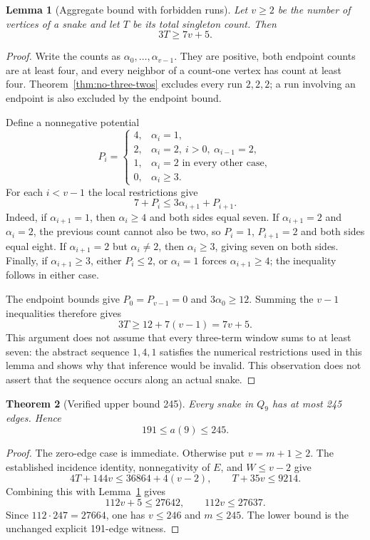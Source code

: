 \documentclass[11pt,a4paper]{article}
\newtheorem{theorem}{Theorem}[section]
\newtheorem{lemma}[theorem]{Lemma}
\theoremstyle{definition}
\theoremstyle{remark}
\newcommand{\Q}{Q}
\begin{document}
\begin{lemma}[Aggregate bound with forbidden runs]\label{lem:run-potential}
Let $v\ge2$ be the number of vertices of a snake and let $T$ be its total singleton count. Then
\[
3T\ge7v+5.
\]
\end{lemma}
\begin{proof}
Write the counts as $\alpha_0,\ldots,\alpha_{v-1}$. They are positive, both endpoint counts are at least four, and every neighbor of a count-one vertex has count at least four. Theorem~\ref{thm:no-three-twos} excludes every run $2,2,2$; a run involving an endpoint is also excluded by the endpoint bound.

Define a nonnegative potential
\[
P_i=\begin{cases}
4,&\alpha_i=1,\\
2,&\alpha_i=2,\ i>0,\ \alpha_{i-1}=2,\\
1,&\alpha_i=2\text{ in every other case},\\
0,&\alpha_i\ge3.
\end{cases}
\]
For each $i<v-1$ the local restrictions give
\[
7+P_i\le3\alpha_{i+1}+P_{i+1}.
\]
Indeed, if $\alpha_{i+1}=1$, then $\alpha_i\ge4$ and both sides equal seven. If $\alpha_{i+1}=2$ and $\alpha_i=2$, the previous count cannot also be two, so $P_i=1$, $P_{i+1}=2$ and both sides equal eight. If $\alpha_{i+1}=2$ but $\alpha_i\ne2$, then $\alpha_i\ge3$, giving seven on both sides. Finally, if $\alpha_{i+1}\ge3$, either $P_i\le2$, or $\alpha_i=1$ forces $\alpha_{i+1}\ge4$; the inequality follows in either case.

The endpoint bounds give $P_0=P_{v-1}=0$ and $3\alpha_0\ge12$. Summing the $v-1$ inequalities therefore gives
\[
3T\ge12+7(v-1)=7v+5.
\]
This argument does not assume that every three-term window sums to at least seven: the abstract sequence $1,4,1$ satisfies the numerical restrictions used in this lemma and shows why that inference would be invalid. This observation does not assert that the sequence occurs along an actual snake.
\end{proof}

\begin{theorem}[Verified upper bound 245]\label{thm:upper245}
Every snake in $\Q_9$ has at most 245 edges. Hence
\[
\boxed{191\le a(9)\le245.}
\]
\end{theorem}
\begin{proof}
The zero-edge case is immediate. Otherwise put $v=m+1\ge2$. The established incidence identity, nonnegativity of $E$, and $W\le v-2$ give
\[
4T+144v\le36864+4(v-2),\qquad T+35v\le9214.
\]
Combining this with Lemma~\ref{lem:run-potential} gives
\[
112v+5\le27642,\qquad112v\le27637.
\]
Since $112\cdot247=27664$, one has $v\le246$ and $m\le245$. The lower bound is the unchanged explicit 191-edge witness.
\end{proof}
\end{document}
